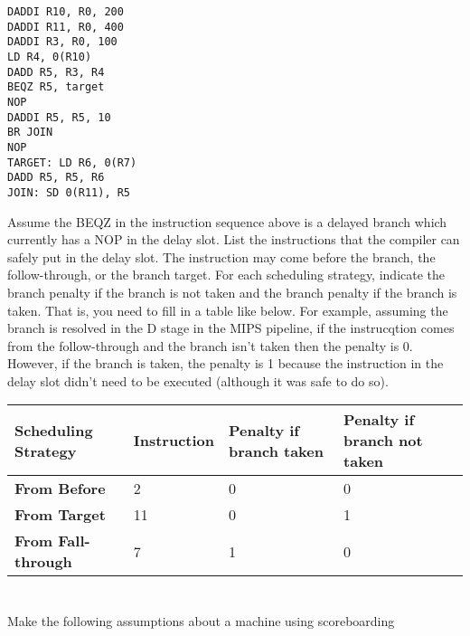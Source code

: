 \documentclass{article}
\begin{document}
\vspace{5mm} 
\begin{lstlisting}
DADDI R10, R0, 200
DADDI R11, R0, 400
DADDI R3, R0, 100
LD R4, 0(R10)
DADD R5, R3, R4
BEQZ R5, target
NOP
DADDI R5, R5, 10
BR JOIN
NOP
TARGET: LD R6, 0(R7)
DADD R5, R5, R6
JOIN: SD 0(R11), R5	
\end{lstlisting}

\vspace{5mm}
Assume the BEQZ in the instruction sequence above is a delayed branch which currently has a NOP in the delay slot. List the instructions that the compiler can safely put in the delay slot. The instruction may come before the branch, the follow-through, or the branch target. For each scheduling strategy, indicate the branch penalty if the branch is not taken and the branch penalty if the branch is taken. That is, you need to fill in a table like below.  For example, assuming the branch is resolved in the D stage in the MIPS pipeline, if the instrucqtion comes from the follow-through and the branch isn't taken then the penalty is 0.  However, if the branch is taken, the penalty is 1 because the instruction in the delay slot didn't need to be executed (although it was safe to do so).

\vspace{5mm}
\begin{tabular}{|l||l|l|l|}
\hline
\textbf{Scheduling Strategy} & \textbf{Instruction} & \textbf{Penalty if branch taken} & \textbf{Penalty if branch not taken} \\
\hline
\textbf{From Before} & 2 & 0& 0\\ 
\textbf{From Target} & 11 & 0 & 1\\ 
\textbf{From Fall-through} & 7 & 1&0 \\

\hline
	
\end{tabular}
\pagebreak
\section{} 
Make the following assumptions about a machine using scoreboarding
\end{document}
